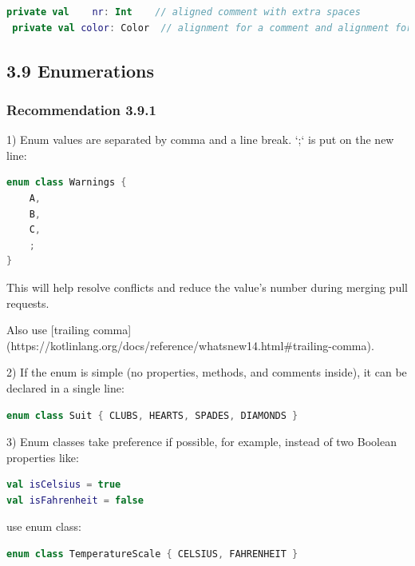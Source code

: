 {{{{\begin{lstlisting}[language=Kotlin]
 private val    nr: Int    // aligned comment with extra spaces
 private val color: Color  // alignment for a comment and alignment for identifier name
\end{lstlisting}


\subsection*{\textbf{3.9 Enumerations}}

\subsubsection*{\textbf{Recommendation 3.9.1}}
\leavevmode\newline

1) Enum values are separated by comma and a line break. `;` is put on the new line:

\begin{lstlisting}[language=Kotlin]
enum class Warnings {
    A,
    B,
    C,
    ;
}
\end{lstlisting}


This will help resolve conflicts and reduce the value's number during merging pull requests.

Also use [trailing comma](https://kotlinlang.org/docs/reference/whatsnew14.html\#trailing-comma).



2) If the enum is simple (no properties, methods, and comments inside), it can be declared in a single line:

\begin{lstlisting}[language=Kotlin]
enum class Suit { CLUBS, HEARTS, SPADES, DIAMONDS }
\end{lstlisting}


3) Enum classes take preference if possible, for example, instead of two Boolean properties like:



\begin{lstlisting}[language=Kotlin]
val isCelsius = true
val isFahrenheit = false
\end{lstlisting}


use enum class:

\begin{lstlisting}[language=Kotlin]
enum class TemperatureScale { CELSIUS, FAHRENHEIT }
\end{lstlisting}


}}}}
